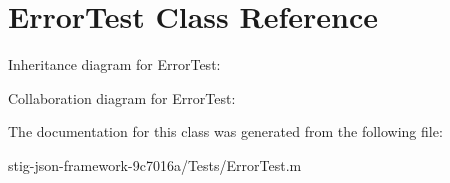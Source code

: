 \hypertarget{interface_error_test}{
\section{\-Error\-Test \-Class \-Reference}
\label{interface_error_test}
}


\-Inheritance diagram for \-Error\-Test\-:


\-Collaboration diagram for \-Error\-Test\-:


\-The documentation for this class was generated from the following file\-:\begin{DoxyCompactItemize}
\item 
stig-\/json-\/framework-\/9c7016a/\-Tests/\-Error\-Test.\-m\end{DoxyCompactItemize}
